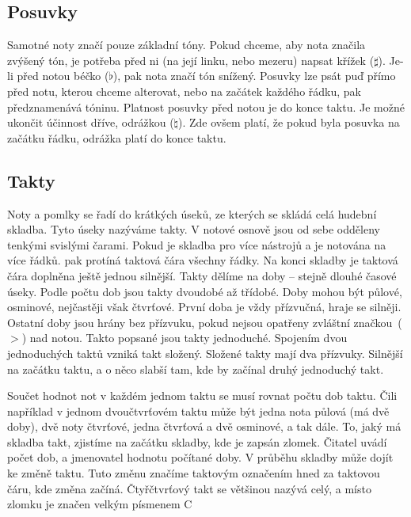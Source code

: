 
\subsection*{Posuvky}
Samotné noty značí pouze základní tóny.
Pokud chceme, aby nota značila zvýšený tón, je potřeba před ni (na její linku, nebo mezeru) napsat křížek ($\sharp $).
Je-li před notou béčko ($\flat $), pak nota značí tón snížený.
Posuvky lze psát puď přímo před notu, kterou chceme alterovat, nebo na začátek každého řádku, pak předznamenává tóninu.
Platnost posuvky před notou je do konce taktu.
Je možné ukončit účinnost dříve, odrážkou ($\natural $).
Zde ovšem platí, že pokud byla posuvka na začátku řádku, odrážka platí do konce taktu.\cite{cmiral,zenkl}

\subsection*{Takty}
Noty a pomlky se řadí do krátkých úseků, ze kterých se skládá celá hudební skladba.
Tyto úseky nazýváme takty.
V notové osnově jsou od sebe odděleny tenkými svislými čarami.
Pokud je skladba pro více nástrojů a je notována na více řádků. pak protíná taktová čára všechny řádky.
Na konci skladby je taktová čára doplněna ještě jednou silnější. 
Takty dělíme na doby -- stejně dlouhé časové úseky.
Podle počtu dob jsou takty dvoudobé až třídobé.
Doby mohou být půlové, osminové, nejčastěji však čtvrťové.
První doba je vždy přízvučná, hraje se silněji.
Ostatní doby jsou hrány bez přízvuku, pokud nejsou opatřeny zvláštní značkou~($>$) nad notou.
Takto popsané jsou takty jednoduché.
Spojením dvou jednoduchých taktů vzniká takt složený.
Složené takty mají dva přízvuky.
Silnější na začátku taktu, a o něco slabší tam, kde by začínal druhý jednoduchý takt.\par
Součet hodnot not v každém jednom taktu se musí rovnat počtu dob taktu.
Čili například v jednom  dvoučtvrťovém taktu může být jedna nota půlová (má dvě doby), dvě noty čtvrťové, jedna čtvrťová a dvě osminové, a tak dále.
To, jaký má skladba takt, zjistíme na začátku skladby, kde je zapsán zlomek.
Čitatel uvádí počet dob, a jmenovatel hodnotu počítané doby.
V průběhu skladby může dojít ke změně taktu.
Tuto změnu značíme taktovým označením hned za taktovou čáru, kde změna začíná.
Čtyřčtvrťový takt se většinou nazývá celý, a místo zlomku je značen velkým písmenem C
\cite{cmiral,zenkl}


